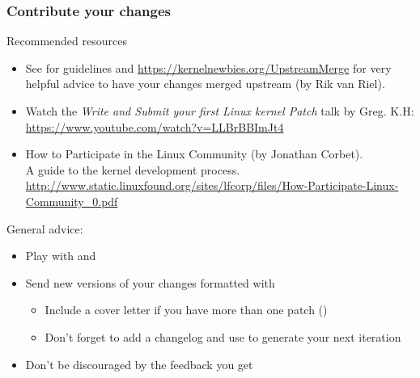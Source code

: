 \begin{frame}
  \frametitle{Contribute your changes}
  \small
  Recommended resources
  \begin{itemize}
  \item See  for guidelines
    and \url{https://kernelnewbies.org/UpstreamMerge} for very
    helpful advice to have your changes merged upstream (by Rik van
    Riel).
  \item Watch the \emph{Write and Submit your first Linux kernel
      Patch} talk by Greg. K.H:
    \url{https://www.youtube.com/watch?v=LLBrBBImJt4}
  \item How to Participate in the Linux Community (by Jonathan Corbet).\\
    A guide to the kernel development process.
    {\scriptsize \url{http://www.static.linuxfound.org/sites/lfcorp/files/How-Participate-Linux-Community_0.pdf}}
  \end{itemize}
  General advice:
  \begin{itemize}
  \item Play with  and 
  \item Send new versions of your changes formatted with 
    \begin{itemize}
    \item Include a cover letter if you have more than one patch
      ()
    \item Don't forget to add a changelog and use  to generate
      your next iteration
    \end{itemize}
  \item Don't be discouraged by the feedback you get
  \end{itemize}
\end{frame}
